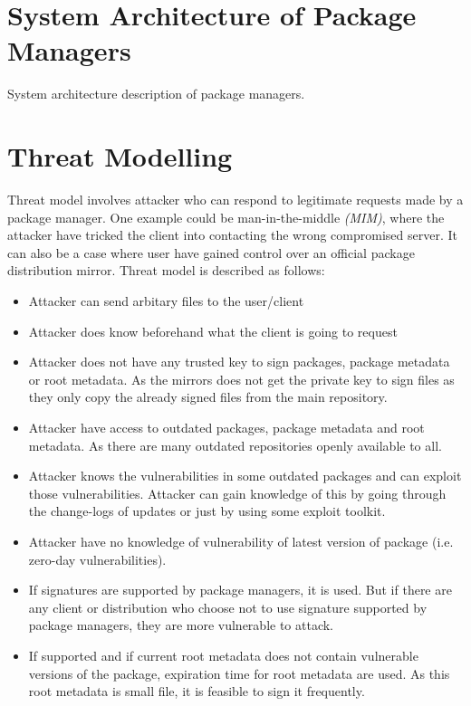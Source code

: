 \documentclass{IEEEtran}
\begin{document}
\section{System Architecture of Package Managers}
\label{sec:sys-architecture}
System architecture description of package managers.

\section{Threat Modelling}
\label{sec:threat-modelling}
Threat model involves attacker who can respond to legitimate requests made by a package manager. One example could be man-in-the-middle \emph{(MIM)}, where the attacker have tricked the client into contacting the wrong compromised server. It can also be a case where user have gained control over an official package distribution mirror. Threat model is described as follows:

\begin{itemize}
	\item Attacker can send arbitary files to the user/client
	\item Attacker does know beforehand what the client is going to request
	\item Attacker does not have any trusted key to sign packages, package metadata or root metadata. As the mirrors does not get the private key to sign files as they only copy the already signed files from the main repository.
	\item Attacker have access to outdated packages, package metadata and root metadata. As there are many outdated repositories openly available to all.
	\item Attacker knows the vulnerabilities in some outdated packages and can exploit those vulnerabilities. Attacker can gain knowledge of this by going through the change-logs of updates or just by using some exploit toolkit.
	\item Attacker have no knowledge of vulnerability of latest version of package (i.e. zero-day vulnerabilities).
	\item If signatures are supported by package managers, it is used. But if there are any client or distribution who choose not to use signature supported by package managers, they are more vulnerable to attack.
	\item If supported and if current root metadata does not contain vulnerable versions of the package, expiration time for root metadata are used. As this root metadata is small file, it is feasible to sign it frequently. 
\end{itemize}
\end{document}
